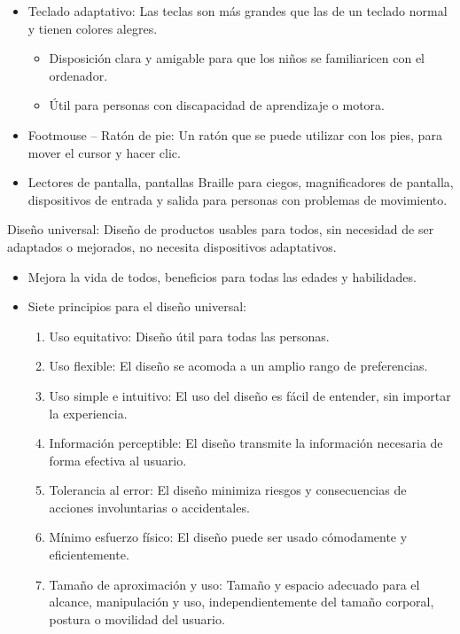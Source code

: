 \documentclass[12pt, twoside, openright]{report} %
\begin{document}
\begin{itemize}
	\item Teclado adaptativo: Las teclas son más grandes que las de un teclado
	      normal y tienen colores alegres.

	      \begin{itemize}
		      \item Disposición clara y amigable para que los niños se familiaricen
		            con el ordenador.

		      \item Útil para personas con discapacidad de aprendizaje o motora.
	      \end{itemize}
	\item Footmouse -- Ratón de pie: Un ratón que se puede utilizar con los
	      pies, para mover el cursor y hacer clic.
	\item Lectores de pantalla, pantallas Braille para ciegos, magnificadores
	      de pantalla, dispositivos de entrada y salida para personas con
	      problemas de movimiento.
\end{itemize}
\pagebreak
Diseño universal: Diseño de productos usables para todos, sin
necesidad de ser adaptados o mejorados, no necesita dispositivos
adaptativos.

\begin{itemize}
	\item Mejora la vida de todos, beneficios para todas las edades y
	      habilidades.
	\item Siete principios para el diseño universal:

	      \begin{enumerate}
		      \def\labelenumi{\arabic{enumi}.}


		      \item Uso equitativo: Diseño útil para todas las personas.

		      \item Uso flexible: El diseño se acomoda a un amplio rango de
		            preferencias.

		      \item Uso simple e intuitivo: El uso del diseño es fácil de entender,
		            sin importar la experiencia.

		      \item Información perceptible: El diseño transmite la información
		            necesaria de forma efectiva al usuario.

		      \item Tolerancia al error: El diseño minimiza riesgos y consecuencias de
		            acciones involuntarias o accidentales.

		      \item Mínimo esfuerzo físico: El diseño puede ser usado cómodamente y
		            eficientemente.

		      \item Tamaño de aproximación y uso: Tamaño y espacio adecuado para el
		            alcance, manipulación y uso, independientemente del tamaño
		            corporal, postura o movilidad del usuario.
	      \end{enumerate}
\end{itemize}
\end{document}
